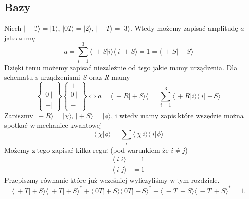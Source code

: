 \subsection{Bazy}
Niech $\vert +T \rangle = \vert 1 \rangle$, $\vert 0T \rangle = \vert 2 \rangle$, $\vert -T \rangle = \vert 3 \rangle$. Wtedy możemy zapisać amplitudę $a$ jako sumę
\begin{equation*}
	a = \sum_{i = 1}^3 \langle\ +S \vert i \rangle \langle\ i \vert +S \rangle = 1 = \langle\ +S \vert +S \rangle
\end{equation*}
Dzięki temu możemy zapisać niezależnie od tego jakie mamy urządzenia. Dla schematu z urządzeniami $S$ oraz $R$ mamy
\begin{equation*}
	\left\{\begin{array}{lr}
		+ \\
		0 \hspace{3pt} \vert \\
		- \vert
	\end{array}\right\} 
	\left\{\begin{array}{lr}
		+ \\
		0 \hspace{3pt} \vert \\
		- \vert
	\end{array}\right\} 
	\iff a =  \langle\ +R \vert +S \rangle \langle\ = \sum_{i = 1}^3 \langle\ +R \vert i \rangle \langle\ i \vert +S \rangle
\end{equation*}
Zapiszmy $\vert +R \rangle = \vert \chi \rangle$, $\vert +S \rangle = \vert \phi \rangle$, i wtedy mamy zapis które wszędzie można spotkać w mechanice kwantowej
\begin{equation*}
	\langle\ \chi \vert \phi \rangle = \sum_{i} \langle\ \chi \vert i \rangle \langle\ i \vert \phi \rangle
\end{equation*}
Możemy z tego zapisać kilka reguł (pod warunkiem że $i \neq j$)
\begin{equation*}
	\begin{split}
		\langle\ i \vert i \rangle &= 1 \\
		\langle\ i \vert j \rangle &= 1
	\end{split}
\end{equation*}
Przepiszmy równanie które już wcześniej wyliczyliśmy w tym rozdziale.
\begin{equation*}
	\langle\ +T\vert+S \rangle \langle\ +T\vert+S \rangle^* + \langle\ 0T\vert+S \rangle \langle\ 0T\vert+S \rangle^* +\langle\ -T\vert+S \rangle \langle\ -T\vert+S \rangle^* =1.
\end{equation*}
